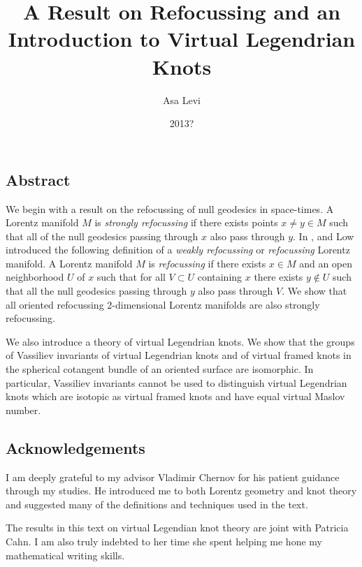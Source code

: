 \documentclass[copyright, final]{dcthesis}
\title{A Result on Refocussing and an Introduction to Virtual Legendrian Knots}
\author{Asa Levi}
\date{2013?}
\numberwithin{equation}{section}
\theoremstyle{plain}
\theoremstyle{definition}
\theoremstyle{definition}
\theoremstyle{remark}
\begin{document}
\frontmatter

\maketitle

\chapter*{}
\section*{Abstract}
We begin with a result on the refocussing of null geodesics in space-times.  A Lorentz manifold $M$ is \emph{strongly refocussing} if there exists points $x \neq y\in M$ such that all of the null geodesics passing through $x$ also pass through $y$.  In \cite{LowCS}, \cite{LowSS} and \cite{LowNull} Low introduced the following definition of a \emph{weakly refocussing} or \emph{refocussing} Lorentz manifold.  A Lorentz manifold $M$ is \emph{refocussing} if there exists $x\in M$ and an open neighborhood $U$ of $x$ such that for all $V\subset U$ containing $x$ there exists $y \notin U$ such that all the null geodesics passing through $y$ also pass through $V$.  We show that all oriented refocussing 2-dimensional Lorentz manifolds are also strongly refocussing.

We also introduce a theory of virtual Legendrian knots.  We show that the groups of Vassiliev invariants of virtual Legendrian knots and of virtual framed knots in the spherical cotangent bundle of an oriented surface are isomorphic.  In particular, Vassiliev invariants cannot be used to distinguish virtual Legendrian knots which are isotopic as virtual framed knots and have equal virtual Maslov number.

\newpage
\vspace{1 in}
\section*{Acknowledgements}
I am deeply grateful to my advisor Vladimir Chernov for his patient guidance through my studies.  He introduced me to both Lorentz geometry and knot theory and suggested many of the definitions and techniques used in the text.

The results in this text on virtual Legendian knot theory are joint with Patricia Cahn.  I am also truly indebted to her time she spent helping me hone my mathematical writing skills.
\end{document}
